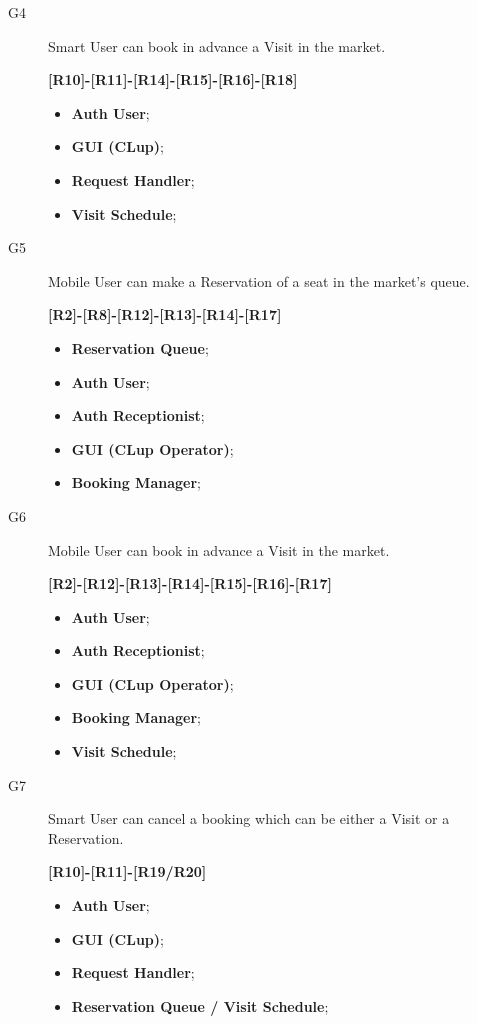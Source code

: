 \begin{description}
    
    \item[G4]Smart User can book in advance a Visit in the market.\par
    \textbf{[R10]-[R11]-[R14]-[R15]-[R16]-[R18]}
    \begin{itemize}
        \item \textbf{Auth User};  
        \item \textbf{GUI (CLup)};  
        \item \textbf{Request Handler}; 
        \item \textbf{Visit Schedule};  
     
    \end{itemize}
    
    \item[G5]Mobile User can make a Reservation of a seat in the market's queue.\par \textbf{[R2]-[R8]-[R12]-[R13]-[R14]-[R17]}
    \begin{itemize}
        \item \textbf{Reservation Queue};  
        \item \textbf{Auth User}; 
        \item \textbf{Auth Receptionist};  
        \item \textbf{GUI (CLup Operator)};  
        \item \textbf{Booking Manager};
    \end{itemize}
    
    \item[G6]Mobile User can book in advance a Visit in the market.\par
    \textbf{[R2]-[R12]-[R13]-[R14]-[R15]-[R16]-[R17]}
     \begin{itemize}
        \item \textbf{Auth User}; 
        \item \textbf{Auth Receptionist};  
        \item \textbf{GUI (CLup Operator)};  
        \item \textbf{Booking Manager};
        \item \textbf{Visit Schedule};  
    \end{itemize}
    
    \item[G7]Smart User can cancel a booking which can be either a Visit or a Reservation.\par
    \textbf{[R10]-[R11]-[R19/R20]}
    \begin{itemize}
        \item \textbf{Auth User}; 
        \item \textbf{GUI (CLup)};  
        \item \textbf{Request Handler};   
        \item \textbf{Reservation Queue / Visit Schedule};  
    \end{itemize}
    

\end{description}
